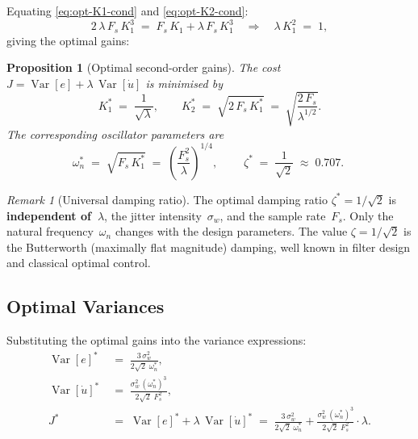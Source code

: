 \documentclass[11pt, a4paper]{article}
\theoremstyle{definition}
\theoremstyle{plain}
\newtheorem{proposition}[theorem]{Proposition}
\theoremstyle{remark}
\newtheorem{remark}{Remark}[section]
\newcommand{\Var}{\operatorname{Var}}
\begin{document}
Equating \eqref{eq:opt-K1-cond} and \eqref{eq:opt-K2-cond}:
\begin{equation}
  2\,\lambda\,F_s\,K_1^3
    \;=\; F_s\,K_1 + \lambda\,F_s\,K_1^3
  \quad\Longrightarrow\quad
  \lambda\,K_1^2 \;=\; 1,
\end{equation}
giving the optimal gains:

\begin{proposition}[Optimal second-order gains]\label{prop:opt-gains}
  The cost $J = \Var[e] + \lambda\,\Var[\dot{u}]$ is minimised by
  \begin{equation}\label{eq:opt-K1}
    K_1^* \;=\; \frac{1}{\sqrt{\lambda}},
    \qquad
    K_2^* \;=\; \sqrt{2\,F_s\,K_1^*}
          \;=\; \sqrt{\frac{2\,F_s}{\lambda^{1/2}}}.
  \end{equation}
  The corresponding oscillator parameters are
  \begin{equation}\label{eq:opt-osc}
    \omega_n^* \;=\; \sqrt{F_s\,K_1^*}
              \;=\; \left(\frac{F_s^2}{\lambda}\right)^{\!1/4},
    \qquad
    \boxed{\;\zeta^* \;=\; \frac{1}{\sqrt{2}}
      \;\approx\; 0.707.\;}
  \end{equation}
\end{proposition}

\begin{remark}[Universal damping ratio]
  The optimal damping ratio $\zeta^* = 1/\sqrt{2}$ is
  \textbf{independent of~$\lambda$}, the jitter intensity~$\sigma_w$,
  and the sample rate~$F_s$.  Only the natural frequency~$\omega_n$
  changes with the design parameters.  The value
  $\zeta = 1/\sqrt{2}$ is the Butterworth (maximally flat magnitude)
  damping, well known in filter design and classical optimal control.
\end{remark}

\subsection{Optimal Variances}\label{sec:opt-variances}

Substituting the optimal gains into the variance expressions:
\begin{align}
  \Var[e]^*
    &\;=\; \frac{3\,\sigma_w^2}{2\sqrt{2}\;\omega_n^*},
    \label{eq:opt-var-e} \\[6pt]
  \Var[\dot{u}]^*
    &\;=\; \frac{\sigma_w^2\,(\omega_n^*)^3}{2\sqrt{2}\;F_s^2},
    \label{eq:opt-var-v} \\[6pt]
  J^*
    &\;=\; \Var[e]^* + \lambda\,\Var[\dot{u}]^*
    \;=\; \frac{3\,\sigma_w^2}{2\sqrt{2}\;\omega_n^*}
      + \frac{\sigma_w^2\,(\omega_n^*)^3}{2\sqrt{2}\;F_s^2}\cdot\lambda.
    \label{eq:opt-J}
\end{align}
\end{document}
